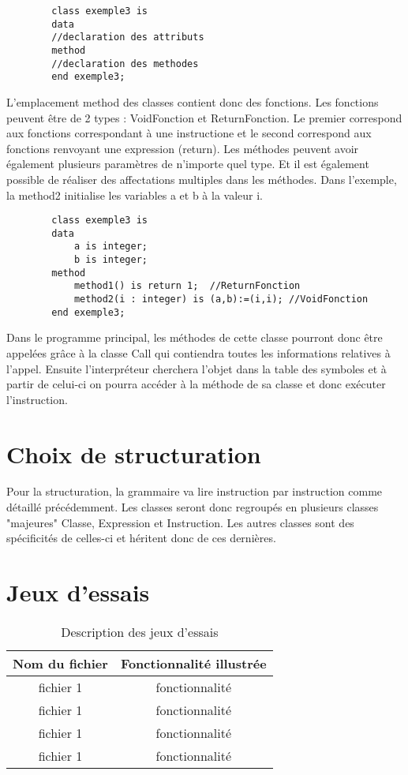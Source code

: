 \documentclass{report}
\begin{document}
	\begin{lstlisting}
		class exemple3 is
		data
		//declaration des attributs
		method
		//declaration des methodes
		end exemple3;
	\end{lstlisting}
	\par 
	L'emplacement method des classes contient donc des fonctions. Les fonctions peuvent être de 2 types : VoidFonction et ReturnFonction. Le premier correspond aux fonctions correspondant à une instructione et le second correspond aux fonctions renvoyant une expression (return). Les méthodes peuvent avoir également plusieurs paramètres de n'importe quel type. Et il est également possible de réaliser des affectations multiples dans les méthodes. Dans l'exemple, la method2 initialise les variables a et b à la valeur i.
	\begin{lstlisting}
		class exemple3 is
		data
			a is integer;
			b is integer;
		method
			method1() is return 1;	//ReturnFonction
			method2(i : integer) is (a,b):=(i,i); //VoidFonction
		end exemple3;
	\end{lstlisting}
	Dans le programme principal, les méthodes de cette classe pourront donc être appelées grâce à la classe Call qui contiendra toutes les informations relatives à l'appel. Ensuite l'interpréteur cherchera l'objet dans la table des symboles et à partir de celui-ci on pourra accéder à la méthode de sa classe et donc exécuter l'instruction.
	\section{Choix de structuration}
	Pour la structuration, la grammaire va lire instruction par instruction comme détaillé précédemment. Les classes seront donc regroupés en plusieurs classes "majeures" Classe, Expression et Instruction. Les autres classes sont des spécificités de celles-ci et héritent donc de ces dernières. 
	\section{Jeux d'essais}
	\begin{table}[!h]
		\begin{center}
		\begin{tabular}{|c|c|}
			\hline
			\textbf{Nom du fichier} & \textbf{Fonctionnalité illustrée}\\
			\hline
			fichier 1 & fonctionnalité\\
			\hline
			fichier 1 & fonctionnalité\\
			\hline
			fichier 1 & fonctionnalité\\
			\hline
			fichier 1 & fonctionnalité\\
			\hline
		\end{tabular}
		\end{center}
		\caption{Description des jeux d'essais}
	\end{table}
\end{document}
